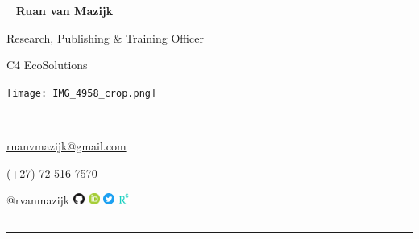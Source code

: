 \begin{multicols}{3}
  \
  \vfill
  \raggedleft
    {\huge \textbf{Ruan van Mazijk}} \par
    {\large Research, Publishing \& Training Officer} \par
    C4 EcoSolutions
  \vfill
  \
  \begin{center}
    \texttt{[image: IMG\_4958\_crop.png]}
  \end{center}
  \columnbreak
  \par \
  \vfill
  \raggedright
    {\large \href{mailto:ruanvmazijk@gmail.com}{ruanvmazijk@gmail.com}} \par
    (+27) 72 516 7570 \par
    @rvanmazijk
      \href{https://github.com/rvanmazijk}
           {\includegraphics[width=1em]{logos/GitHub.png}}
      \href{https://orcid.org/0000-0003-2659-6909}
           {\includegraphics[width=1em]{logos/ORCID.png}}
      \href{https://twitter.com/rvanmazijk}
           {\includegraphics[width=1em]{logos/Twitter.png}}
      \href{https://www.researchgate.net/profile/Ruan-Van-Mazijk}
           {\includegraphics[width=1em]{logos/ResearchGate-white_crop.jpg}}
  \vfill
  \
\end{multicols}

\hrule \vskip2pt \hrule
